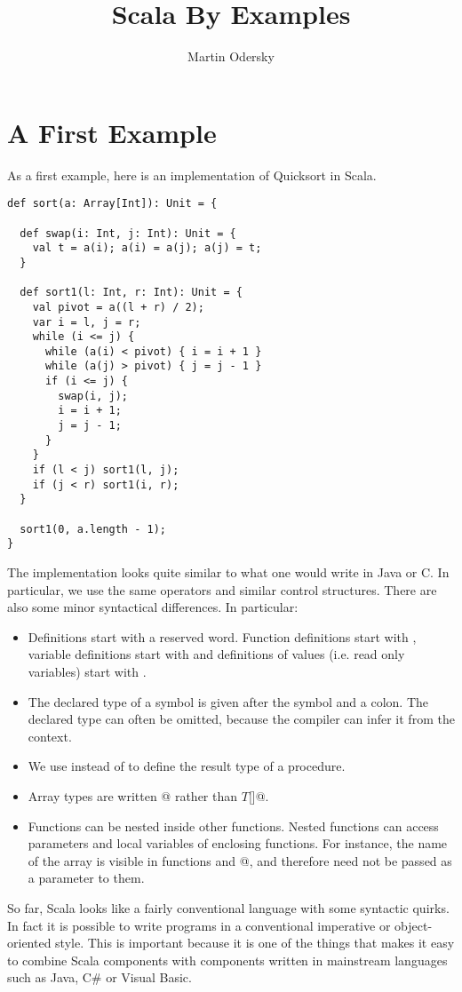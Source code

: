 \documentclass[11pt]{report}
\title{Scala By Examples}
\author{
Martin Odersky
}
\begin{document}
\maketitle

\chapter{\label{sec:example-one}A First Example}

As a first example, here is an implementation of Quicksort in Scala.
\begin{verbatim}
def sort(a: Array[Int]): Unit = {

  def swap(i: Int, j: Int): Unit = {
    val t = a(i); a(i) = a(j); a(j) = t;
  }

  def sort1(l: Int, r: Int): Unit = {
    val pivot = a((l + r) / 2);
    var i = l, j = r;
    while (i <= j) {
      while (a(i) < pivot) { i = i + 1 }
      while (a(j) > pivot) { j = j - 1 }
      if (i <= j) {
        swap(i, j);
        i = i + 1;
        j = j - 1;
      }
    }
    if (l < j) sort1(l, j);
    if (j < r) sort1(i, r);
  }

  sort1(0, a.length - 1);
}
\end{verbatim}
The implementation looks quite similar to what one would write in
Java or C.  In particular, we use the same operators and similar control
structures.  There are also some minor syntactical differences. In particular:
\begin{itemize}
\item
Definitions start with a reserved word. Function definitions start
with \verb@def@, variable definitions start with \verb@var@ and
definitions of values (i.e. read only variables) start with \verb@val@.
\item
The declared type of a symbol is given after the symbol and a colon.
The declared type can often be omitted, because the compiler can infer
it from the context.
\item
We use \verb@Unit@ instead of \verb@void@ to define the result type of
a procedure.
\item
Array types are written \verb@Array[$T$]@ rather than \verb@$T$[]@.
\item
Functions can be nested inside other functions. Nested functions can
access parameters and local variables of enclosing functions. For
instance, the name of the array \verb@a@ is visible in functions
\verb@swap@ and @, and therefore need not be passed as a
parameter to them.
\end{itemize}
So far, Scala looks like a fairly conventional language with some
syntactic quirks. In fact it is possible to write programs in a
conventional imperative or object-oriented style. This is important
because it is one of the things that makes it easy to combine Scala
components with components written in mainstream languages such as
Java, C\# or Visual Basic.
\end{document}

